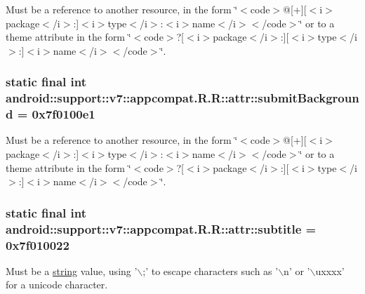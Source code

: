Must be a reference to another resource, in the form \char`\"{}$<$code$>$@\mbox{[}+\mbox{]}\mbox{[}$<$i$>$package$<$/i$>$:\mbox{]}$<$i$>$type$<$/i$>$:$<$i$>$name$<$/i$>$$<$/code$>$\char`\"{} or to a theme attribute in the form \char`\"{}$<$code$>$?\mbox{[}$<$i$>$package$<$/i$>$:\mbox{]}\mbox{[}$<$i$>$type$<$/i$>$:\mbox{]}$<$i$>$name$<$/i$>$$<$/code$>$\char`\"{}. \hypertarget{classandroid_1_1support_1_1v7_1_1appcompat_1_1_r_1_1attr_3ab4bf5515b683e43ab549908b53f91d}{
\subsubsection[{submitBackground}]{\setlength{\rightskip}{0pt plus 5cm}static final int android::support::v7::appcompat.R.R::attr::submitBackground = 0x7f0100e1}}
\label{classandroid_1_1support_1_1v7_1_1appcompat_1_1_r_1_1attr_3ab4bf5515b683e43ab549908b53f91d}


Must be a reference to another resource, in the form \char`\"{}$<$code$>$@\mbox{[}+\mbox{]}\mbox{[}$<$i$>$package$<$/i$>$:\mbox{]}$<$i$>$type$<$/i$>$:$<$i$>$name$<$/i$>$$<$/code$>$\char`\"{} or to a theme attribute in the form \char`\"{}$<$code$>$?\mbox{[}$<$i$>$package$<$/i$>$:\mbox{]}\mbox{[}$<$i$>$type$<$/i$>$:\mbox{]}$<$i$>$name$<$/i$>$$<$/code$>$\char`\"{}. \hypertarget{classandroid_1_1support_1_1v7_1_1appcompat_1_1_r_1_1attr_89bea78297464a7e9eb8df2238d6dde3}{
\subsubsection[{subtitle}]{\setlength{\rightskip}{0pt plus 5cm}static final int android::support::v7::appcompat.R.R::attr::subtitle = 0x7f010022}}
\label{classandroid_1_1support_1_1v7_1_1appcompat_1_1_r_1_1attr_89bea78297464a7e9eb8df2238d6dde3}


Must be a \hyperlink{classandroid_1_1support_1_1v7_1_1appcompat_1_1_r_1_1string}{string} value, using '$\backslash$;' to escape characters such as '$\backslash$n' or '$\backslash$uxxxx' for a unicode character. 

